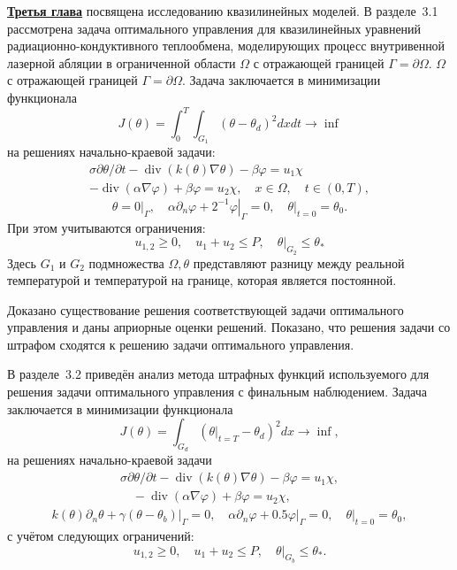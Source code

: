 \underline{\textbf{Третья глава}} посвящена исследованию квазилинейных моделей.
В разделе~3.1 рассмотрена задача оптимального управления для
квазилинейных уравнений радиационно-кондуктивного
теплообмена, моделирующих процесс внутривенной
лазерной абляции в ограниченной области $\Omega$ с отражающей границей $\Gamma=\partial\Omega$.
$\Omega$ с отражающей границей $\Gamma=\partial\Omega$.
Задача заключается в минимизации функционала
\[ J(\theta)=\int_{0}^{T} \int_{G_{1}}\left(\theta-\theta_{d}\right)^{2} dx dt \rightarrow \inf \]
на решениях начально-краевой задачи:
\begin{equation}
    \label{eq:3_2:1}
    \begin{gathered}
        \sigma \partial \theta / \partial t-\operatorname{div}(k(\theta)
        \nabla \theta)-\beta \varphi=u_{1} \chi \\
        -\operatorname{div}(\alpha \nabla \varphi)+\beta \varphi=u_{2}
        \chi, \quad x \in \Omega, \quad t \in(0, T),
    \end{gathered}
\end{equation}
\begin{equation}
    \label{eq:3_2:2}
    \theta=\left.0\right|_{\Gamma},
    \quad \alpha \partial_{n} \varphi
    +\left.2^{-1} \varphi\right|_{\Gamma}=0,
    \left.\quad \theta\right|_{t=0}=\theta_{0}.
\end{equation}
При этом учитываются ограничения:
\[ u_{1,2} \geq 0, \quad u_{1}+u_{2} \leq P, \left.\quad \theta\right|_{G_{2}} \leq \theta_{*} \]
Здесь $G_{1}$ и $G_{2}$ подмножества $\Omega, \theta$
представляют разницу между реальной температурой
и температурой на границе, которая является постоянной.

Доказано существование решения соответствующей задачи оптимального
управления и даны априорные оценки решений.
Показано, что решения задачи со штрафом сходятся к решению задачи оптимального управления.

В разделе~3.2 приведён анализ метода штрафных функций используемого
для решения задачи оптимального управления с финальным наблюдением.
Задача заключается в минимизации функционала
\[
    J(\theta)=\int_{G_{d}}\left(\left.\theta\right|_{t=T}
    -\theta_{d}\right)^{2} d x \rightarrow \inf,
\]
на решениях начально-краевой задачи
\begin{gather}
    \label{eq:3_3:1}
    \sigma \partial \theta / \partial t-\operatorname{div}(k(\theta) \nabla \theta)
    -\beta \varphi=u_{1} \chi, \\
    \quad-\operatorname{div}(\alpha \nabla \varphi)+\beta \varphi= u_{2} \chi,
\end{gather}
\begin{gather}
    \label{eq:3_3:2}
    k(\theta) \partial_{n} \theta+\left.\gamma
    \left(\theta-\theta_{b}\right)\right|_{\Gamma}=0,
    \quad \alpha \partial_{n} \varphi +
    \left.0.5 \varphi\right|_{\Gamma}=0,\left.\quad \theta\right|_{t=0}=\theta_{0},
\end{gather}
с учётом следующих ограничений:
\[
    u_{1,2} \geq 0, \quad u_{1}+u_{2} \leq P,\left.\quad \theta\right|_{G_{b}} \leq \theta_{*}.
\]


